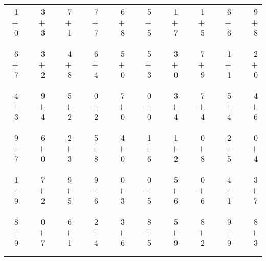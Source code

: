 \documentclass[12pt, letterpaper]{article}
\begin{document}
\begin{tabular}{rrrrrrrrrrrrrrrrrrr}
1 & & 3 & & 7 & & 7 & & 6 & & 5 & & 1 & & 1 & & 6 & & 9\\
$+$ 0 & & $+$ 3 & & $+$ 1 & & $+$ 7 & & $+$ 8 & & $+$ 5 & & $+$ 7 & & $+$ 5 & & $+$ 6 & & $+$ 8\\
\cline{1-1} \cline{3-3} \cline{5-5} \cline{7-7} \cline{9-9} \cline{11-11} \cline{13-13} \cline{15-15} \cline{17-17} \cline{19-19} \\ \\
6 & & 3 & & 4 & & 6 & & 5 & & 5 & & 3 & & 7 & & 1 & & 2\\
$+$ 7 & & $+$ 2 & & $+$ 8 & & $+$ 4 & & $+$ 0 & & $+$ 3 & & $+$ 0 & & $+$ 9 & & $+$ 1 & & $+$ 0\\
\cline{1-1} \cline{3-3} \cline{5-5} \cline{7-7} \cline{9-9} \cline{11-11} \cline{13-13} \cline{15-15} \cline{17-17} \cline{19-19} \\ \\
4 & & 9 & & 5 & & 0 & & 7 & & 0 & & 3 & & 7 & & 5 & & 4\\
$+$ 3 & & $+$ 4 & & $+$ 2 & & $+$ 2 & & $+$ 0 & & $+$ 0 & & $+$ 4 & & $+$ 4 & & $+$ 4 & & $+$ 6\\
\cline{1-1} \cline{3-3} \cline{5-5} \cline{7-7} \cline{9-9} \cline{11-11} \cline{13-13} \cline{15-15} \cline{17-17} \cline{19-19} \\ \\
9 & & 6 & & 2 & & 5 & & 4 & & 1 & & 1 & & 0 & & 2 & & 0\\
$+$ 7 & & $+$ 0 & & $+$ 3 & & $+$ 8 & & $+$ 0 & & $+$ 6 & & $+$ 2 & & $+$ 8 & & $+$ 5 & & $+$ 4\\
\cline{1-1} \cline{3-3} \cline{5-5} \cline{7-7} \cline{9-9} \cline{11-11} \cline{13-13} \cline{15-15} \cline{17-17} \cline{19-19} \\ \\
1 & & 7 & & 9 & & 9 & & 0 & & 0 & & 5 & & 0 & & 4 & & 3\\
$+$ 9 & & $+$ 2 & & $+$ 5 & & $+$ 6 & & $+$ 3 & & $+$ 5 & & $+$ 6 & & $+$ 6 & & $+$ 1 & & $+$ 7\\
\cline{1-1} \cline{3-3} \cline{5-5} \cline{7-7} \cline{9-9} \cline{11-11} \cline{13-13} \cline{15-15} \cline{17-17} \cline{19-19} \\ \\
8 & & 0 & & 6 & & 2 & & 3 & & 8 & & 5 & & 8 & & 9 & & 8\\
$+$ 9 & & $+$ 7 & & $+$ 1 & & $+$ 4 & & $+$ 6 & & $+$ 5 & & $+$ 9 & & $+$ 2 & & $+$ 9 & & $+$ 3\\
\cline{1-1} \cline{3-3} \cline{5-5} \cline{7-7} \cline{9-9} \cline{11-11} \cline{13-13} \cline{15-15} \cline{17-17} \cline{19-19} \\ \\

\end{tabular}
\end{document}
